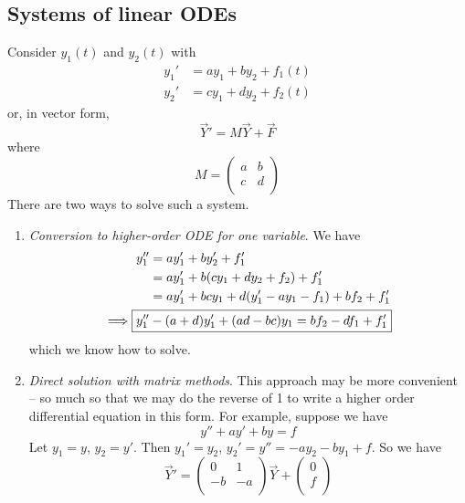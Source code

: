 \documentclass{../template/note}
\begin{document}
    
    \subsection{Systems of linear ODEs}

    Consider \(y_1(t)\) and \(y_2(t)\) with
    \begin{align*}
        y_1' &= a y_1 + b y_2 + f_1(t) \\
        y_2' &= c y_1 + d y_2 + f_2(t)
    \end{align*}
    or, in vector form,
    \[
        \vec Y' = M \vec Y + \vec F
    \]
    where
    \[
        M = \begin{pmatrix}
         a & b \\
         c & d \\
        \end{pmatrix}
    \]
    There are two ways to solve such a system.
    \begin{enumerate}[label=\protect\circled{\arabic*}]
        \item \emph{Conversion to higher-order ODE for one variable}. We have
        \begin{align*}
            y_1'' &= ay_1' + by_2' + f_1' \\
            &= ay_1' + b(cy_1 + dy_2 + f_2) + f_1' \\
            &= ay_1' + bcy_1 + d(y_1' - ay_1 - f_1) + bf_2 + f_1' \\
            \implies \Aboxed{y_1'' &- (a+d)y_1' + (ad-bc)y_1 = bf_2 - df_1 + f_1'}
        \end{align*}
        which we know how to solve.
        \item \emph{Direct solution with matrix methods}. This approach may be more convenient -- so much so that we may do the reverse of 1 to write a higher order differential equation in this form. For example, suppose we have
        \[
            y'' + ay' + by = f
        \]
        Let \(y_1 = y\), \(y_2 = y'\). Then \(y_1' = y_2\), \(y_2' = y'' = -ay_2 -by_1 + f\). So we have
        \[
            \vec Y' = \begin{pmatrix}
             0 & 1 \\
             -b & -a \\
            \end{pmatrix} \vec Y + \begin{pmatrix}
             0 \\
             f \\
            \end{pmatrix}
        \]
    \end{enumerate}
\end{document}
